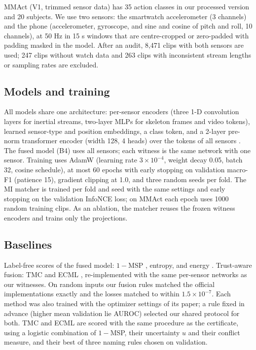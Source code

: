 \documentclass[conference]{IEEEtran}
\begin{document}
MMAct \cite{Ref3} (V1, trimmed sensor data) has 35 action classes in our processed version and 20 subjects. We use two sensors: the smartwatch accelerometer (3 channels) and the phone (accelerometer, gyroscope, and sine and cosine of pitch and roll, 10 channels), at 50 Hz in 15 s windows that are centre-cropped or zero-padded with padding masked in the model. After an audit, 8,471 clips with both sensors are used; 247 clips without watch data and 263 clips with inconsistent stream lengths or sampling rates are excluded.

\subsection{Models and training}
All models share one architecture: per-sensor encoders (three 1-D convolution layers for inertial streams, two-layer MLPs for skeleton frames and video tokens), learned sensor-type and position embeddings, a class token, and a 2-layer pre-norm transformer encoder (width 128, 4 heads) over the tokens of all sensors \cite{Ref16}. The fused model (B4) uses all sensors; each witness is the same network with one sensor. Training uses AdamW \cite{Ref17} (learning rate $3\times10^{-4}$, weight decay 0.05, batch 32, cosine schedule), at most 60 epochs with early stopping on validation macro-F1 (patience 15), gradient clipping at 1.0, and three random seeds per fold. The MI matcher is trained per fold and seed with the same settings and early stopping on the validation InfoNCE loss; on MMAct each epoch uses 1000 random training clips. As an ablation, the matcher reuses the frozen witness encoders and trains only the projections.

\subsection{Baselines}
Label-free scores of the fused model: $1-$MSP \cite{Ref4}, entropy, and energy \cite{Ref11}. Trust-aware fusion: TMC \cite{Ref6} and ECML \cite{Ref7}, re-implemented with the same per-sensor networks as our witnesses. On random inputs our fusion rules matched the official implementations exactly and the losses matched to within $1.5\times10^{-7}$. Each method was also trained with the optimizer settings of its paper; a rule fixed in advance (higher mean validation lie AUROC) selected our shared protocol for both. TMC and ECML are scored with the same procedure as the certificate, using a logistic combination of $1-$MSP, their uncertainty $u$ and their conflict measure, and their best of three naming rules chosen on validation.
\end{document}
